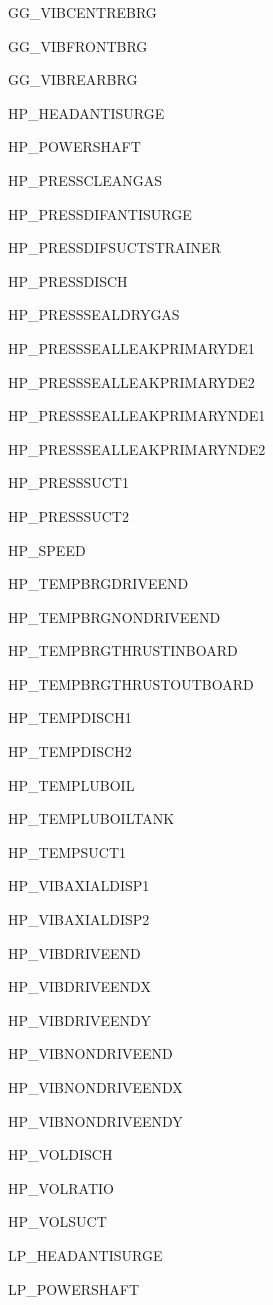 \documentclass[runningheads]{llncs}
\begin{document}
\begin{multicols}{3}
\begin{enumerate}
{			\item GG\_VIBCENTREBRG
			\item GG\_VIBFRONTBRG
			\item GG\_VIBREARBRG
			\item HP\_HEADANTISURGE
			\item HP\_POWERSHAFT
			\item HP\_PRESSCLEANGAS
			\item HP\_PRESSDIFANTISURGE
			\item HP\_PRESSDIFSUCTSTRAINER
			\item HP\_PRESSDISCH
			\item HP\_PRESSSEALDRYGAS
			\item HP\_PRESSSEALLEAKPRIMARYDE1
			\item HP\_PRESSSEALLEAKPRIMARYDE2
			\item HP\_PRESSSEALLEAKPRIMARYNDE1
			\item HP\_PRESSSEALLEAKPRIMARYNDE2
			\item HP\_PRESSSUCT1
			\item HP\_PRESSSUCT2
			\item HP\_SPEED
			\item HP\_TEMPBRGDRIVEEND
			\item HP\_TEMPBRGNONDRIVEEND
			\item HP\_TEMPBRGTHRUSTINBOARD
			\item HP\_TEMPBRGTHRUSTOUTBOARD
			\item HP\_TEMPDISCH1
			\item HP\_TEMPDISCH2
			\item HP\_TEMPLUBOIL
			\item HP\_TEMPLUBOILTANK
			\item HP\_TEMPSUCT1
			\item HP\_VIBAXIALDISP1
			\item HP\_VIBAXIALDISP2
			\item HP\_VIBDRIVEEND
			\item HP\_VIBDRIVEENDX
			\item HP\_VIBDRIVEENDY
			\item HP\_VIBNONDRIVEEND
			\item HP\_VIBNONDRIVEENDX
			\item HP\_VIBNONDRIVEENDY
			\item HP\_VOLDISCH
			\item HP\_VOLRATIO
			\item HP\_VOLSUCT
			\item LP\_HEADANTISURGE
			\item LP\_POWERSHAFT
}
\end{enumerate}
\end{multicols}
\end{document}

